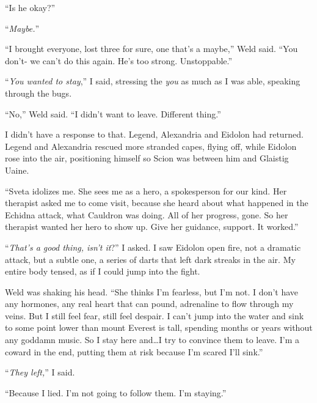 ``Is he okay?''



``\emph{Maybe.}''



``I brought everyone, lost three for sure, one that's a maybe,'' Weld said.  ``You don't-  we can't do this again.  He's too strong.  Unstoppable.''



``\emph{You wanted to stay},'' I said, stressing the \emph{you} as much as I was able, speaking through the bugs.



``No,'' Weld said.  ``I didn't want to leave.  Different thing.''



I didn't have a response to that.  Legend, Alexandria and Eidolon had returned.  Legend and Alexandria rescued more stranded capes, flying off, while Eidolon rose into the air, positioning himself so Scion was between him and Glaistig Uaine.



``Sveta idolizes me.  She sees me as a hero, a spokesperson for our kind.  Her therapist asked me to come visit, because she heard about what happened in the Echidna attack, what Cauldron was doing.  All of her progress, gone.  So her therapist wanted her hero to show up.  Give her guidance, support.  It worked.''



``\emph{That's a good thing, isn't it}?'' I asked.  I saw Eidolon open fire, not a dramatic attack, but a subtle one, a series of darts that left dark streaks in the air.  My entire body tensed, as if I could jump into the fight.



Weld was shaking his head.  ``She thinks I'm fearless, but I'm not.  I don't have any hormones, any real heart that can pound, adrenaline to flow through my veins.  But I still feel fear, still feel despair.  I can't jump into the water and sink to some point lower than mount Everest is tall, spending months or years without any goddamn music.  So I stay here and\ldots I try to convince them to leave.  I'm a coward in the end, putting them at risk because I'm scared I'll sink.''



``\emph{They left,}'' I said.



``Because I lied.  I'm not going to follow them.  I'm staying.''



